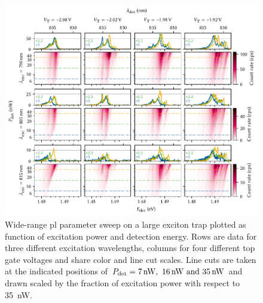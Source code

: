 \begin{figure}
    \centering
    \includegraphics{img/pdf/experiment/doped_M1_05_49-2_multiplets}
    \caption[
        \protect\newline
    ]{
        Wide-range \gls{pl} parameter sweep on a large exciton trap plotted as function of excitation power and detection energy.
        Rows are data for three different excitation wavelengths, columns for four different top gate voltages \VT and share color and line cut scales.
        Line cuts are taken at the indicated positions of $P_{\mathrm{det}} = \qtylist{7;16;35}{\nano\watt}$ and drawn scaled by the fraction of excitation power with respect to \qty{35}{\nano\watt}.
    }
    \label{fig:exp:pl:doped_M1_05_49-2_multiplets}
\end{figure}


